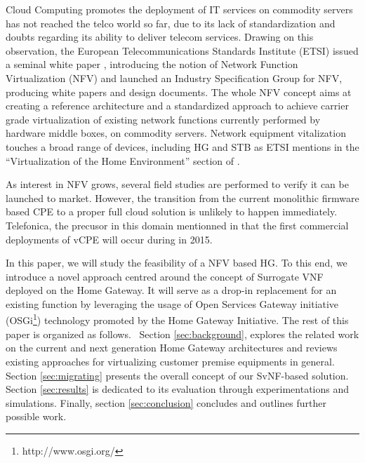 Cloud Computing promotes the deployment of IT services on commodity servers has not reached the telco world so far, due to its lack of standardization and doubts regarding its ability to deliver telecom services. 
Drawing on this observation, the European Telecommunications Standards Institute (ETSI) issued a seminal white paper \cite{_network_2012}, introducing the notion of Network Function Virtualization (NFV) and launched an Industry Specification Group for NFV, producing white papers and design documents.
The whole NFV concept aims at creating a reference architecture and a standardized approach to achieve carrier grade virtualization of existing network functions currently performed by hardware middle boxes, on commodity servers.
Network equipment vitalization touches a broad range of devices, including HG and STB as ETSI mentions in the “Virtualization of the Home Environment” section of \cite{_network_2013}. 

As interest in NFV grows, several field studies are performed to verify it can be launched to market.
However, the transition from the current monolithic firmware based CPE to a proper full cloud solution is unlikely to happen immediately. Telefonica, the precusor in this domain mentionned in \cite{enrique_blanco_telefonica_2015} that the first commercial deployments of vCPE will occur during in 2015.

In this paper, we will study the feasibility of a NFV based HG.  To this end, we introduce a novel  approach centred around the concept of Surrogate VNF deployed on the Home Gateway.
It will serve as a drop-in replacement for an existing function by leveraging the usage of Open Services Gateway initiative (OSGi\footnote{http://www.osgi.org/}) technology promoted by the Home Gateway Initiative.
The rest of this paper is organized as follows.
~Section \ref{sec:background}, explores the related work on the current and next generation Home Gateway architectures and reviews existing approaches for virtualizing customer premise equipments in general.
Section \ref{sec:migrating} presents the overall concept of our SvNF-based solution. Section \ref{sec:results} is dedicated to its evaluation through experimentations and simulations. Finally, section \ref{sec:conclusion} concludes and outlines further possible work.


